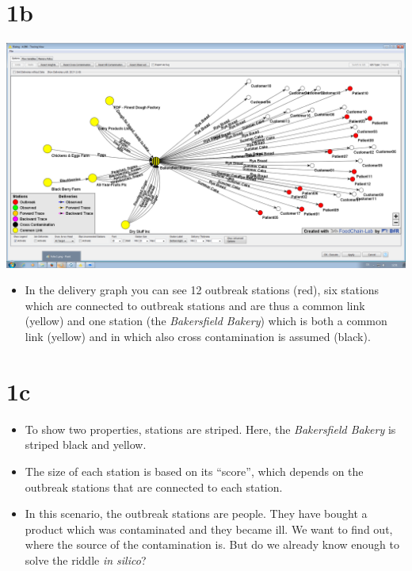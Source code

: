 \documentclass[10pt]{beamer}
\begin{document}
\section{1b}
\begin{frame}
	\begin{center}
  		\includegraphics[height=0.6\textheight]{1b.png}
	\end{center}
	\begin{itemize}
		\item In the delivery graph you can see 12 outbreak stations (red), six stations which are connected to outbreak stations and are thus a common link (yellow) and one station (the \textit{Bakersfield Bakery}) which is both a common link (yellow) and in which also cross contamination is assumed (black).
	\end{itemize}
\end{frame}

\section{1c}
\begin{frame}
	\begin{itemize}
		\item To show two properties, stations are striped. Here, the \textit{Bakersfield Bakery} is striped  black and yellow.
		\item The size of each station is based on its ``score'', which depends on the outbreak stations that are connected to each station.
		\item In this scenario, the outbreak stations are people. They have bought a product which was contaminated and they became ill. We want to find out, where the source of the contamination is. But do we already know enough to solve the riddle \textit{in silico}?
	\end{itemize}
\end{frame}
\end{document}
